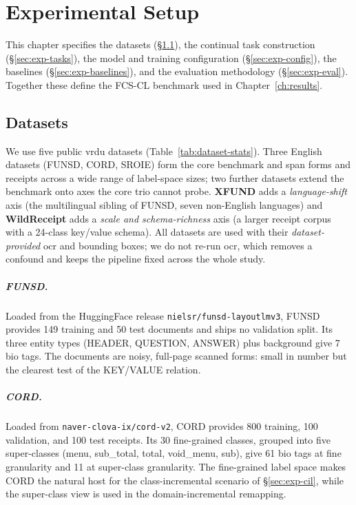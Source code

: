 \chapter{Experimental Setup}
\label{ch:experimental-setup}

This chapter specifies the datasets (\S\ref{sec:exp-datasets}), the continual
task construction (\S\ref{sec:exp-tasks}), the model and training configuration
(\S\ref{sec:exp-config}), the baselines (\S\ref{sec:exp-baselines}), and the
evaluation methodology (\S\ref{sec:exp-eval}). Together these define the FCS-CL
benchmark used in Chapter~\ref{ch:results}.

\section{Datasets}
\label{sec:exp-datasets}

We use five public \gls{vrdu} datasets (Table~\ref{tab:dataset-stats}). Three
English datasets (FUNSD, CORD, SROIE) form the core benchmark and span forms and
receipts across a wide range of label-space sizes; two further datasets extend the
benchmark onto axes the core trio cannot probe. \textbf{XFUND} adds a
\emph{language-shift} axis (the multilingual sibling of FUNSD, seven non-English
languages) and \textbf{WildReceipt} adds a \emph{scale and schema-richness} axis
(a larger receipt corpus with a 24-class key/value schema). All datasets are used
with their \emph{dataset-provided} \gls{ocr} and bounding boxes; we do not re-run
\gls{ocr}, which removes a confound and keeps the pipeline fixed across the whole
study.

\paragraph{FUNSD.} Loaded from the HuggingFace release
\texttt{nielsr/funsd-layoutlmv3}, FUNSD provides 149 training and 50 test
documents and ships no validation split. Its three entity types (HEADER,
QUESTION, ANSWER) plus background give 7 \gls{bio} tags. The documents are
noisy, full-page scanned forms: small in number but the clearest test of the
KEY/VALUE relation.

\paragraph{CORD.} Loaded from \texttt{naver-clova-ix/cord-v2}, CORD provides
800 training, 100 validation, and 100 test receipts. Its 30 fine-grained
classes, grouped into five super-classes (menu, sub\_total, total, void\_menu,
sub), give 61 \gls{bio} tags at fine granularity and 11 at super-class
granularity. The fine-grained label space makes CORD the natural host for the
class-incremental scenario of \S\ref{sec:exp-cil}, while the super-class view
is used in the domain-incremental remapping.

